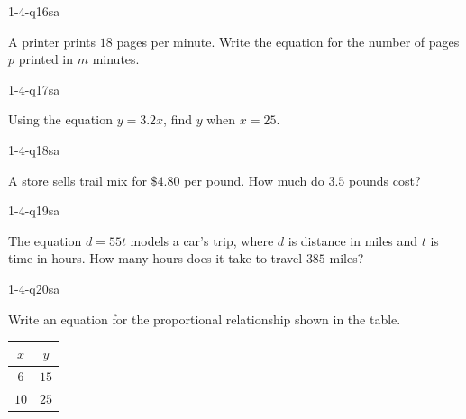 
\begin{practiceQuestion}{1-4-q16}{sa}
\begin{questionText}
A printer prints $18$ pages per minute. Write the equation for the number of pages $p$ printed in $m$ minutes.
\end{questionText}
\end{practiceQuestion}

\begin{practiceQuestion}{1-4-q17}{sa}
\begin{questionText}
Using the equation $y = 3.2x$, find $y$ when $x = 25$.
\end{questionText}
\end{practiceQuestion}

\begin{practiceQuestion}{1-4-q18}{sa}
\begin{questionText}
A store sells trail mix for $\$4.80$ per pound. How much do $3.5$ pounds cost?
\end{questionText}
\end{practiceQuestion}

\begin{practiceQuestion}{1-4-q19}{sa}
\begin{questionText}
The equation $d = 55t$ models a car's trip, where $d$ is distance in miles and $t$ is time in hours. How many hours does it take to travel $385$ miles?
\end{questionText}
\end{practiceQuestion}

\begin{practiceQuestion}{1-4-q20}{sa}
\begin{questionText}
Write an equation for the proportional relationship shown in the table.

\begin{center}
\begin{tabular}{|c|c|}
\hline
$x$ & $y$ \\
\hline
$6$ & $15$ \\
$10$ & $25$ \\
\hline
\end{tabular}
\end{center}
\end{questionText}
\end{practiceQuestion}

